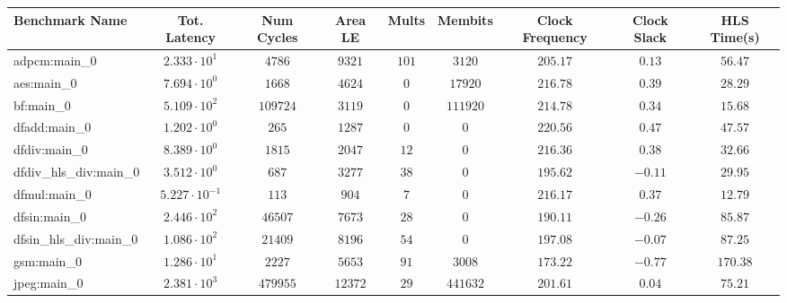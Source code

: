 \begin{tabular}{|l|c|c|c|c|c|c|c|c|}
\hline
Benchmark Name          & Tot. Latency            & Num Cycles & Area LE   & Mults   & Membits    & Clock Frequency & Clock Slack & HLS Time(s) \\
\hline
adpcm:main\_0           & $ 2.333 \cdot 10^{1}  $ & $ 4786   $ & $ 9321  $ & $ 101 $ & $ 3120   $ & $ 205.17      $ & $ 0.13    $ & $ 56.47   $ \\
aes:main\_0             & $ 7.694 \cdot 10^{0}  $ & $ 1668   $ & $ 4624  $ & $ 0   $ & $ 17920  $ & $ 216.78      $ & $ 0.39    $ & $ 28.29   $ \\
bf:main\_0              & $ 5.109 \cdot 10^{2}  $ & $ 109724 $ & $ 3119  $ & $ 0   $ & $ 111920 $ & $ 214.78      $ & $ 0.34    $ & $ 15.68   $ \\
dfadd:main\_0           & $ 1.202 \cdot 10^{0}  $ & $ 265    $ & $ 1287  $ & $ 0   $ & $ 0      $ & $ 220.56      $ & $ 0.47    $ & $ 47.57   $ \\
dfdiv:main\_0           & $ 8.389 \cdot 10^{0}  $ & $ 1815   $ & $ 2047  $ & $ 12  $ & $ 0      $ & $ 216.36      $ & $ 0.38    $ & $ 32.66   $ \\
dfdiv\_hls\_div:main\_0 & $ 3.512 \cdot 10^{0}  $ & $ 687    $ & $ 3277  $ & $ 38  $ & $ 0      $ & $ 195.62      $ & $ -0.11   $ & $ 29.95   $ \\
dfmul:main\_0           & $ 5.227 \cdot 10^{-1} $ & $ 113    $ & $ 904   $ & $ 7   $ & $ 0      $ & $ 216.17      $ & $ 0.37    $ & $ 12.79   $ \\
dfsin:main\_0           & $ 2.446 \cdot 10^{2}  $ & $ 46507  $ & $ 7673  $ & $ 28  $ & $ 0      $ & $ 190.11      $ & $ -0.26   $ & $ 85.87   $ \\
dfsin\_hls\_div:main\_0 & $ 1.086 \cdot 10^{2}  $ & $ 21409  $ & $ 8196  $ & $ 54  $ & $ 0      $ & $ 197.08      $ & $ -0.07   $ & $ 87.25   $ \\
gsm:main\_0             & $ 1.286 \cdot 10^{1}  $ & $ 2227   $ & $ 5653  $ & $ 91  $ & $ 3008   $ & $ 173.22      $ & $ -0.77   $ & $ 170.38  $ \\
jpeg:main\_0            & $ 2.381 \cdot 10^{3}  $ & $ 479955 $ & $ 12372 $ & $ 29  $ & $ 441632 $ & $ 201.61      $ & $ 0.04    $ & $ 75.21   $ \\

\end{tabular}
